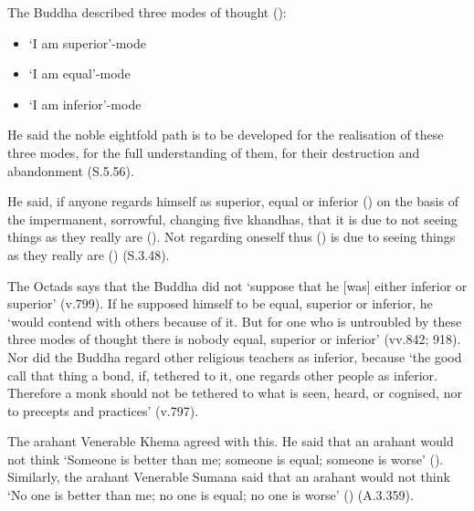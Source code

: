 
The Buddha described three modes of thought ():

\begin{itemize}
\item `I am superior'-mode 
\item `I am equal'-mode 
\item `I am inferior'-mode 
\end{itemize}

He said the noble eightfold path is to be developed for the realisation of these three modes, for the full understanding of them, for their destruction and abandonment (S.5.56).

He said, if anyone regards himself as superior, equal or inferior () on the basis of the impermanent, sorrowful, changing five khandhas, that it is due to not seeing things as they really are (). Not regarding oneself thus () is due to seeing things as they really are () (S.3.48).

The Octads says that the Buddha did not `suppose that he [was] either inferior or superior' (v.799). If he supposed himself to be equal, superior or inferior, he `would contend with others because of it. But for one who is untroubled by these three modes of thought there is nobody equal, superior or inferior' (vv.842; 918). Nor did the Buddha regard other religious teachers as inferior, because `the good call that thing a bond, if, tethered to it, one regards other people as inferior. Therefore a monk should not be tethered to what is seen, heard, or cognised, nor to precepts and practices' (v.797).

The arahant Venerable Khema agreed with this. He said that an arahant would not think `Someone is better than me; someone is equal; someone is worse' (). Similarly, the arahant Venerable Sumana said that an arahant would not think `No one is better than me; no one is equal; no one is worse' () (A.3.359).

